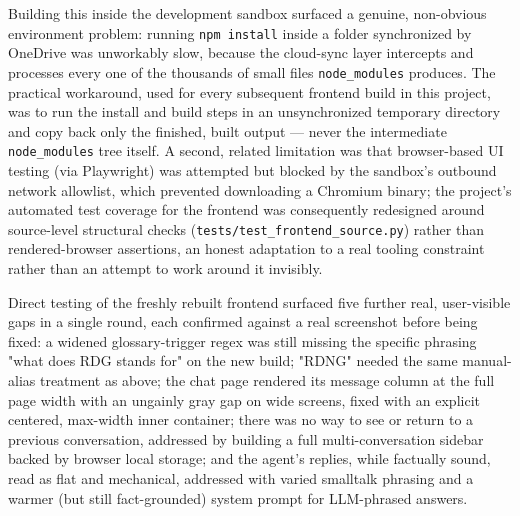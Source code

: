 Building this inside the development sandbox surfaced a genuine, non-obvious environment problem: running \texttt{npm install} inside a folder synchronized by OneDrive was unworkably slow, because the cloud-sync layer intercepts and processes every one of the thousands of small files \texttt{node\_\allowbreak{}modules} produces. The practical workaround, used for every subsequent frontend build in this project, was to run the install and build steps in an unsynchronized temporary directory and copy back only the finished, built output — never the intermediate \texttt{node\_\allowbreak{}modules} tree itself. A second, related limitation was that browser-based UI testing (via Playwright) was attempted but blocked by the sandbox's outbound network allowlist, which prevented downloading a Chromium binary; the project's automated test coverage for the frontend was consequently redesigned around source-level structural checks (\texttt{tests/\allowbreak{}test\_\allowbreak{}frontend\_\allowbreak{}source.py}) rather than rendered-browser assertions, an honest adaptation to a real tooling constraint rather than an attempt to work around it invisibly.

Direct testing of the freshly rebuilt frontend surfaced five further real, user-visible gaps in a single round, each confirmed against a real screenshot before being fixed: a widened glossary-trigger regex was still missing the specific phrasing "what does RDG stands for" on the new build; "RDNG" needed the same manual-alias treatment as above; the chat page rendered its message column at the full page width with an ungainly gray gap on wide screens, fixed with an explicit centered, max-width inner container; there was no way to see or return to a previous conversation, addressed by building a full multi-conversation sidebar backed by browser local storage; and the agent's replies, while factually sound, read as flat and mechanical, addressed with varied smalltalk phrasing and a warmer (but still fact-grounded) system prompt for LLM-phrased answers.

